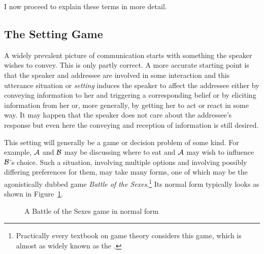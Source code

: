 I now proceed to explain these terms in more detail.

\subsection{The Setting Game}

A widely prevalent picture of communication starts with something the speaker wishes to convey. This is only partly correct. A more accurate starting point is that the speaker and addressee are involved in some interaction and this utterance situation or \emph{setting} induces the speaker to affect the addressee either by conveying information to her and triggering a corresponding belief or by eliciting information from her or, more generally, by getting her to act or react in some way. It may happen  that the speaker does not care about the addressee's response but even here the conveying and reception of information is still desired. 

This setting will generally be a game or decision problem of some kind. For example, $\cal A$ and $\cal B$ may be discussing where to eat and $\cal A$ may wish to influence $\cal B$'s choice. Such a situation, involving multiple options and involving possibly differing preferences for them, may take many forms, one of which may be the  agonistically dubbed game \emph{Battle of the Sexes}.\footnote{Practically every textbook on game theory considers this game, which is almost as widely known as the .} Its normal form typically looks as shown in Figure~\ref{fig:battle of the sexes in normal form}.

\begin{figure}
\caption{A Battle of the Sexes game in normal form}\label{fig:battle of the sexes in normal form}
\end{figure} 

